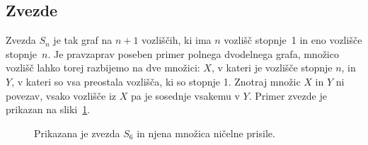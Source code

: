 \documentclass[12pt,a4paper,twoside]{article}
\theoremstyle{definition} %
\theoremstyle{plain} %
\numberwithin{equation}{section}  %
\begin{document}
\subsection{Zvezde}
Zvezda $S_n$ je tak graf na $n+1$ vozliščih, ki ima $n$ vozlišč stopnje~1 in eno vozlišče stopnje~$n$. Je pravzaprav poseben primer polnega dvodelnega grafa, množico vozlišč lahko torej razbijemo na dve množici: $X$, v kateri je vozlišče stopnje $n$, in $Y$, v kateri so vsa preostala vozlišča, ki so stopnje 1. Znotraj množic $X$ in $Y$ ni povezav, vsako vozlišče iz $X$ pa je sosednje vsakemu v $Y$. Primer zvezde je prikazan na sliki~\ref{fig:zvezda}.
\begin{figure}[h]
    \centering
    \caption{Prikazana je zvezda $S_6$ in njena množica ničelne prisile.}
    \label{fig:zvezda}
\end{figure}
\end{document}
